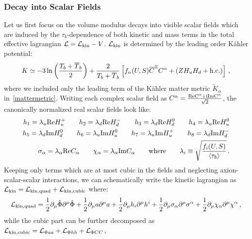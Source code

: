 \documentclass[12pt,a4paper]{book}
\def\nn{\nonumber}
\def\nn{\nonumber}
\newcommand{\mc}{\mathcal}
\begin{document}
\subsubsection*{Decay into Scalar Fields}

Let us first focus on the volume modulus decays into visible scalar fields which are induced by the $\tau_b$-dependence of both kinetic and mass terms in the total effective lagrangian $\mc{L} = \mc{L}_{\rm kin} - V$. $\mc{L}_{\rm kin}$ is determined by the leading order K\"ahler potential:
\begin{align}
K \simeq - 3 \ln\left(\frac{T_b+\overline{T}_b}{2}\right) + \frac{2}{T_b + \overline{T}_b} \left[f_\alpha(U,S) \overline{C}^{\overline{\alpha}} C^\alpha + \left(Z H_u H_d + \rm h.c.\right)\right]\,,
\end{align}
where we included only the leading term of the K\"ahler matter metric $\tilde{K}_\alpha$ in~\eqref{mattermetric}. 
Writing each complex scalar field as $C^\alpha = \frac{\rm{Re} C^\alpha + i \rm{Im} C^\alpha}{\sqrt{2}}$, 
the canonically normalized real scalar fields look like:
\begin{align}
h_1 = \lambda_u {\rm Re} H_u^+ \qquad h_2 = \lambda_d {\rm Re} H_d^-
\qquad h_3 = \lambda_d {\rm Re} H_d^0 \qquad h_4 = \lambda_u {\rm Re} H_u^0  \nn \\
h_5 = \lambda_d {\rm Im} H_d^0  \qquad h_6 = \lambda_u {\rm Im} H_u^0 
\qquad h_7 = \lambda_u {\rm Im} H_u^+  \qquad h_8 = \lambda_d {\rm Im} H_d^- \nn \\
\sigma_\alpha = \lambda_\alpha {\rm Re} C_\alpha \qquad \chi_\alpha = \lambda_\alpha {\rm Im} C_\alpha
\qquad\text{where}\qquad \lambda_i\equiv \sqrt{\frac{f_i(U,S)}{\langle \tau_b\rangle}}\,.
\label{fields}
\end{align}
Keeping only terms which are at most cubic in the fields and neglecting axion-scalar-scalar interactions, we can schematically 
write the kinetic lagrangian as $\mc{L}_{\rm kin} = \mc{L}_{\rm{kin, quad}} + \mc{L}_{\rm{kin, cubic}}$ where:
\begin{align}
\mc{L}_{\rm{kin, quad}} = \frac 12 \partial_\mu \hat\Phi \partial^\mu \hat\Phi + \frac 12 \partial_\mu a \partial^\mu a 
+ \frac 12 \partial_\mu h_i \partial^\mu h^i + \frac{1}{2} \partial_\mu \sigma_\alpha \partial^\mu \sigma^\alpha 
+ \frac{1}{2} \partial_\mu \chi_\alpha \partial^\mu \chi^\alpha\,, \nn
\end{align}
while the cubic part can be further decomposed as $\mc{L}_{\rm{kin, cubic}} = \mc{L}_{\Phi a a} + \mc{L}_{\Phi h h} + \mc{L}_{\Phi C C}$, 
\end{document}

